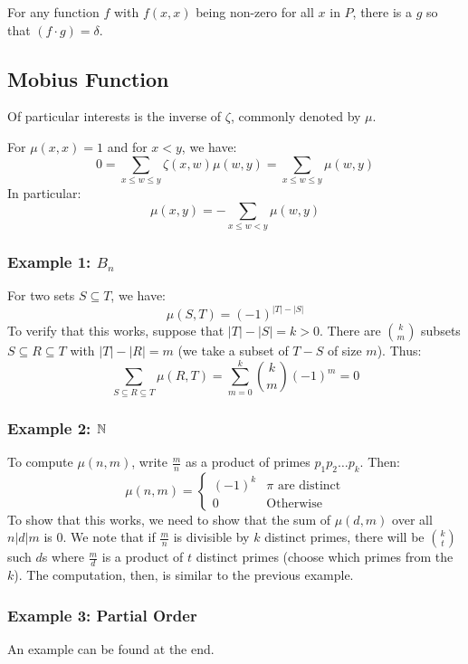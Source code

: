 \documentclass[letterpaper]{article}
\begin{document}
\begin{lemma}{}{}
    For any function $f$ with $f(x, x)$ being non-zero for all $x$ in $P$, there is a $g$ so that $(f \cdot g) = \delta$. 
\end{lemma}

\subsection{Mobius Function}
Of particular interests is the inverse of $\zeta$, commonly denoted by $\mu$.

\bigskip 

For $\mu(x, x) = 1$ and for $x < y$, we have:
\[0 = \sum_{x \leq w \leq y} \zeta(x, w) \mu(w, y) = \sum_{x \leq w \leq y} \mu(w, y)\]
In particular:
\[\mu(x, y) = -\sum_{x \leq w < y} \mu(w, y)\]

\subsubsection{Example 1: \texorpdfstring{$B_n$}{B}}
For two sets $S \subseteq T$, we have:
\[\mu(S, T) = (-1)^{|T| - |S|}\]
To verify that this works, suppose that $|T| - |S| = k > 0$. There are $\binom{k}{m}$ subsets $S \subseteq R \subseteq T$ with $|T| - |R| = m$ (we take a subset of $T - S$ of size $m$). Thus:
\[\sum_{S \subseteq R \subseteq T} \mu(R, T) = \sum_{m = 0}^{k} \binom{k}{m} (-1)^m = 0\]

\subsubsection{Example 2: \texorpdfstring{$\mathbb{N}$}{Natural Numbers}}
To compute $\mu(n, m)$, write $\frac{m}{n}$ as a product of primes $p_1 p_2 \dots p_k$. Then:
\[\mu(n, m) = \begin{cases}
    (-1)^k & \pi \text{ are distinct} \\ 
    0 & \text{Otherwise}
\end{cases}\]
To show that this works, we need to show that the sum of $\mu(d, m)$ over all $n | d | m$ is 0. We note that if $\frac{m}{n}$ is divisible by $k$ distinct primes, there will be $\binom{k}{t}$ such $d$s where $\frac{m}{d}$ is a product of $t$ distinct primes (choose which primes from the $k$). The computation, then, is similar to the previous example. 

\subsubsection{Example 3: Partial Order}
An example can be found at the end. 
\end{document}
